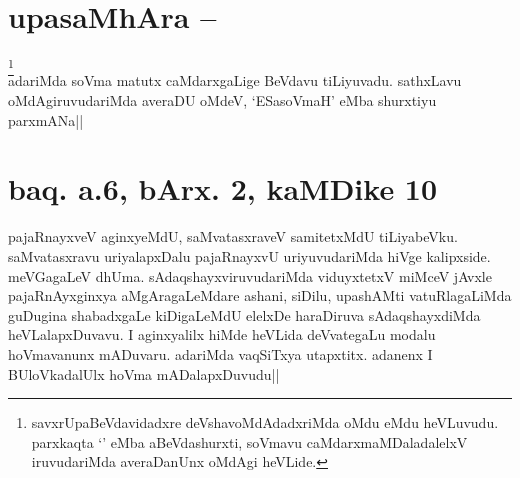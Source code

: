 \section*{upasaMhAra --}

\begin{artha}
\footnote[1]{savxrUpaBeVdavidadxre deVshavoMdAdadxriMda oMdu eMdu 
heVLuvudu. parxkaqta `\stext' eMba aBeVdashurxti, soVmavu 
caMdarxmaMDaladalelxV iruvudariMda averaDanUnx oMdAgi heVLide.}\\
adariMda soVma matutx caMdarxgaLige BeVdavu tiLiyuvadu. sathxLavu 
oMdAgiruvudariMda averaDU oMdeV, `ESasoVmaH' eMba shurxtiyu parxmANa||
\end{artha}


\section*{baq. a.6, bArx. 2, kaMDike 10}

\stext

\begin{artha}
pajaRnayxveV aginxyeMdU, saMvatasxraveV samitetxMdU tiLiyabeVku. 
saMvatasxravu uriyalapxDalu pajaRnayxvU uriyuvudariMda hiVge 
kalipxside. meVGagaLeV dhUma. sAdaqshayxviruvudariMda viduyxtetxV 
miMceV jAvxle pajaRnAyxginxya aMgAragaLeMdare ashani, siDilu, 
upashAMti vatuRlagaLiMda guDugina shabadxgaLe kiDigaLeMdU elelxDe 
haraDiruva sAdaqshayxdiMda heVLalapxDuvavu. I aginxyalilx hiMde 
heVLida deVvategaLu modalu hoVmavanunx mADuvaru. adariMda vaqSiTxya 
utapxtitx. adanenx I BUloVkadalUlx hoVma mADalapxDuvudu||
\end{artha}
